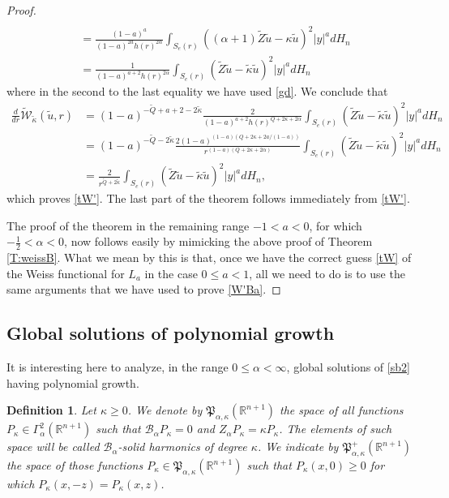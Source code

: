 \documentclass[11pt]{amsart}
\theoremstyle{plain}
\newtheorem{dfn}[thrm]{Definition}
\numberwithin{equation}{section}
\begin{document}
\begin{proof}
\begin{align*}
\\
& = \frac{(1-a)^a}{(1-a)^{2a} h(r)^{2\alpha}} \int_{{S_{e}(r)}}((\alpha + 1) \tilde Z \tilde u -\kappa \tilde u)^2   |y|^{a} dH_{n}
\\
& = \frac{1}{(1-a)^{a + 2} h(r)^{2\alpha}} \int_{{S_{e}(r)}}(\tilde Z \tilde u -\tilde \kappa \tilde u)^2  |y|^{a} dH_{n}
\end{align*}
where in the second to the last equality we have used \eqref{gd}. We conclude that
\begin{align*}
\frac{d}{dr} \tilde{\mathcal W}_{\tilde \kappa}(\tilde u,r) & = (1-a)^{-\tilde Q+a +2-2\tilde \kappa} \frac{2}{(1-a)^{a + 2} h(r)^{Q + 2 \kappa + 2\alpha}} \int_{{S_{e}(r)}}(\tilde Z \tilde u -\tilde \kappa \tilde u)^2 |y|^{a} dH_{n}
\\
& = (1-a)^{-\tilde Q-2\tilde \kappa} \frac{2 (1-a)^{(1-a)(Q+2\kappa +2a/(1-a))}}{r^{(1-a)(Q + 2 \kappa + 2\alpha)}} \int_{{S_{e}(r)}}(\tilde Z \tilde u -\tilde \kappa \tilde u)^2 |y|^{a} dH_{n}
\\
& = \frac{2}{r^{\tilde Q + 2 \tilde\kappa}} \int_{{S_{e}(r)}}(\tilde Z \tilde u -\tilde \kappa \tilde u)^2 |y|^{a} dH_{n},
\end{align*}
which proves \eqref{tW'}. The last part of the theorem follows immediately from \eqref{tW'}.

The proof of the theorem in the remaining range $-1<a<0$, for which $-\frac 12 <\alpha <0$, now follows easily by mimicking the above proof of Theorem \ref{T:weissB}. What we mean by this is that, once we have the correct guess \eqref{tW} of the Weiss functional for $L_a$ in the case $0\le a<1$, all we need to do is to use the same  arguments that we have used to prove \eqref{W'Ba}.

\end{proof}

\subsection{Global solutions of polynomial growth}\label{SS:pol}

It is interesting here to analyze, in the range $0\le \alpha <\infty$, global solutions of \eqref{sb2} having polynomial growth.

\begin{dfn}\label{D:shBa}
Let $\kappa\ge 0$. We denote by $\mathfrak P_{\alpha,\kappa}({\mathbb R}^{n+1})$ the space of all functions $P_\kappa\in \Gamma^2_\alpha({\mathbb R}^{n+1})$ such that ${\mathcal{B}_\alpha} P_\kappa = 0$ and ${Z_\alpha} P_\kappa = \kappa P_\kappa$. The elements of such space will be called ${\mathcal{B}_\alpha}$-\emph{solid harmonics} of degree $\kappa$. We indicate by $\mathfrak P^+_{\alpha,\kappa}({\mathbb R}^{n+1})$ the space of those functions $P_\kappa\in \mathfrak P_{\alpha,\kappa}({\mathbb R}^{n+1})$ such that $P_\kappa(x,0) \ge 0$ for which $P_\kappa(x,-z) = P_\kappa(x,z)$.
\end{dfn}
\end{document}
